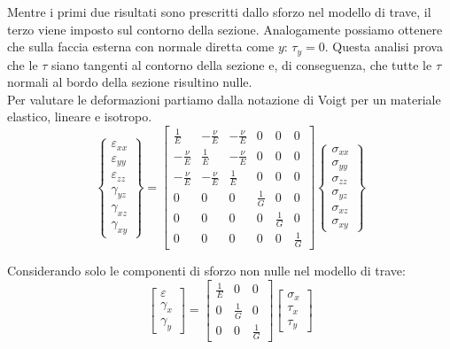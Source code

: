 Mentre i primi due risultati sono prescritti dallo sforzo nel modello di trave, il terzo viene imposto sul contorno della sezione. Analogamente possiamo ottenere che sulla faccia esterna con normale diretta come $y$: $\tau_y = 0$. Questa analisi prova che le $\tau$ siano tangenti al contorno della sezione e, di conseguenza, che tutte le $\tau$ normali al bordo della sezione risultino nulle.\\

Per valutare le deformazioni partiamo dalla notazione di Voigt per un materiale elastico, lineare e isotropo.
\begin{equation*}
\left\{
\begin{array}{c}
\varepsilon_{xx} \\
\varepsilon_{yy} \\
\varepsilon_{zz} \\
\gamma_{yz} \\
\gamma_{xz} \\
\gamma_{xy}
\end{array}
\right\}
=
\left[
\begin{array}{cccccc}
\displaystyle \frac{1}{E} & \displaystyle -\frac{\nu}{E} & \displaystyle -\frac{\nu}{E} & 0 & 0 & 0 \\
\displaystyle -\frac{\nu}{E} & \displaystyle \frac{1}{E} & \displaystyle -\frac{\nu}{E} & 0 & 0 & 0 \\
\displaystyle -\frac{\nu}{E} & \displaystyle -\frac{\nu}{E} & \displaystyle \frac{1}{E} & 0 & 0 & 0 \\
0 & 0 & 0 & \displaystyle \frac{1}{G} & 0 & 0 \\
0 & 0 & 0 & 0 & \displaystyle \frac{1}{G} & 0 \\
0 & 0 & 0 & 0 & 0 & \displaystyle \frac{1}{G}
\end{array}
\right]
\left\{
\begin{array}{c}
\sigma_{xx} \\
\sigma_{yy} \\
\sigma_{zz} \\
\sigma_{yz} \\
\sigma_{xz} \\
\sigma_{xy}
\end{array}
\right\}
\end{equation*}

Considerando solo le componenti di sforzo non nulle nel modello di trave:
\begin{equation*}
    \begin{bmatrix}
\varepsilon \\
\gamma_{x} \\
\gamma_{y}
\end{bmatrix}
=
\begin{bmatrix}
\displaystyle \frac{1}{E} & 0 & 0 \\
0 & \displaystyle \frac{1}{G} & 0 \\
0 & 0 & \displaystyle \frac{1}{G}
\end{bmatrix}
\begin{bmatrix}
\sigma_x \\
\tau_{x} \\
\tau_{y}
\end{bmatrix}
\end{equation*}


